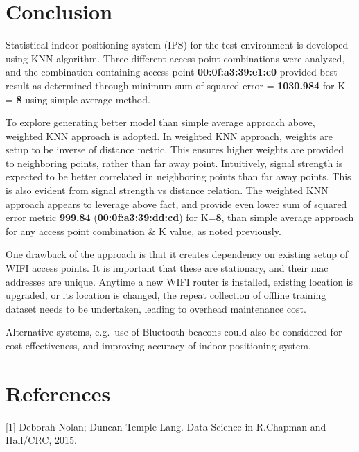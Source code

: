 \documentclass[
]{article}
\begin{document}
\newpage

\hypertarget{conclusion}{%
\section{Conclusion}\label{conclusion}}

Statistical indoor positioning system (IPS) for the test environment is
developed using KNN algorithm. Three different access point combinations
were analyzed, and the combination containing access point
\textbf{00:0f:a3:39:e1:c0} provided best result as determined through
minimum sum of squared error = \textbf{1030.984} for K = \textbf{8}
using simple average method.

To explore generating better model than simple average approach above,
weighted KNN approach is adopted. In weighted KNN approach, weights are
setup to be inverse of distance metric. This ensures higher weights are
provided to neighboring points, rather than far away point. Intuitively,
signal strength is expected to be better correlated in neighboring
points than far away points. This is also evident from signal strength
vs distance relation. The weighted KNN approach appears to leverage
above fact, and provide even lower sum of squared error metric
\textbf{999.84} (\textbf{00:0f:a3:39:dd:cd}) for K=\textbf{8}, than
simple average approach for any access point combination \& K value, as
noted previously.

One drawback of the approach is that it creates dependency on existing
setup of WIFI access points. It is important that these are stationary,
and their mac addresses are unique. Anytime a new WIFI router is
installed, existing location is upgraded, or its location is changed,
the repeat collection of offline training dataset needs to be
undertaken, leading to overhead maintenance cost.

Alternative systems, e.g.~use of Bluetooth beacons could also be
considered for cost effectiveness, and improving accuracy of indoor
positioning system.

\hypertarget{references}{%
\section{References}\label{references}}

\leavevmode\hypertarget{refs}{}%
{[}1{]} Deborah Nolan; Duncan Temple Lang. Data Science in R.Chapman and
Hall/CRC, 2015.
\end{document}
